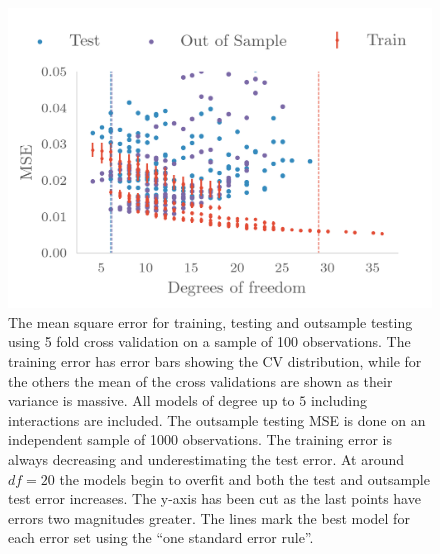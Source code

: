 \begin{figure}
  \centering
  \includegraphics[]{figures/olsmse.png}
  \caption{\label{fig:olsmse} The mean square error for training, testing and
    outsample testing using 5 fold cross validation on a sample of 100
    observations. The training error has error bars showing the CV
    distribution, while for the others the mean of the cross
    validations are shown as their variance is massive. All models of degree up to \(5\) including interactions
    are included. The outsample testing MSE is done on an independent sample of
    1000 observations. The training error is always decreasing and
    underestimating the test error. At around \(df = 20\) the models begin to
    overfit and both the test and outsample test error increases. The y-axis has
  been cut as the last points have errors two magnitudes greater. The lines mark
the best model for each error set using the ``one standard error rule''. }
\end{figure}

